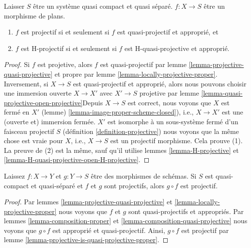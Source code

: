 \begin{lemma}

\label{lemma-projective-is-quasi-projective-proper}

Laisser $S$ être un système quasi compact et quasi séparé. $f : X \to S$ être un morphisme de plans.

\begin{enumerate}

\item  $f$ est projectif si et seulement si $f$ est quasi-projectif et approprié, et
\item  $f$ est H-projectif si et seulement si $f$ est H-quasi-projective et approprié.

\end{enumerate}

\end{lemma}

\begin{proof}

Si $f$ est projetive, alors $f$ est quasi-projectif par lemme \ref{lemma-projective-quasi-projective} et propre par lemme \ref{lemma-locally-projective-proper}. Inversement, si
$X \to S$ est quasi-projectif et approprié, alors nous pouvons choisir une immersion ouverte $X \to X'$ avec $X' \to S$ projetive par lemme \ref{lemma-quasi-projective-open-projective}Depuis $X \to S$ est correct, nous voyons que $X$ est fermé en $X'$
(lemme) \ref{lemma-image-proper-scheme-closed}), i.e.,
$X \to X'$ est une (ouverte et) immersion fermée. $X'$ est isomorphe à un sous-système fermé d'un faisceau projectif $S$ (définition \ref{definition-projective}) nous voyons que la même chose est vraie pour $X$, i.e.,
$X \to S$ est un projectif morphisme. Cela prouve (1). La preuve de (2) est la même, sauf qu'il utilise lemmes \ref{lemma-H-projective} et
\ref{lemma-H-quasi-projective-open-H-projective}.

\end{proof}

\begin{lemma}

\label{lemma-composition-projective}
Laissez $f : X \to Y$ et $g : Y \to S$ être des morphismes de schémas. Si $S$ est quasi-compact et quasi-séparé et $f$ et $g$ sont projectifs, alors $g \circ f$ est projectif.
\end{lemma}

\begin{proof}
Par lemmes \ref{lemma-projective-quasi-projective} et \ref{lemma-locally-projective-proper} nous voyons que $f$ et $g$ sont quasi-projectifs et appropriés. Par lemmes \ref{lemma-composition-proper} et \ref{lemma-composition-quasi-projective} nous voyons que $g \circ f$ est approprié et quasi-projectif. Ainsi, $g \circ f$ est projectif par lemme \ref{lemma-projective-is-quasi-projective-proper}.
\end{proof}

